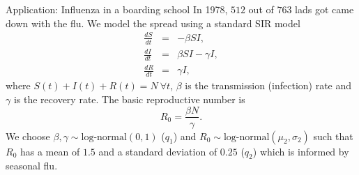 \begin{frame}{Application: Influenza in a boarding school}
In 1978, $512$ out of $763$ lads got came down with the flu.
We model the spread using a standard SIR model
\begin{eqnarray*}
\frac{dS}{dt}&=& - \beta SI,\\
\frac{dI}{dt}&=&  \beta SI - \gamma I,\\
\frac{dR}{dt}&=& \gamma I, 
\end{eqnarray*} 
where  $S(t) + I(t) + R(t) = N \: \forall t$, $\beta$ is the transmission (infection) rate and $\gamma$ is the recovery rate.
The basic reproductive number is 
\begin{equation}
\label{eq:r0def}
R_0 = \frac{\beta N}{\gamma}. 
\end{equation}
We choose $\beta, \gamma \sim \text{log-normal}(0, 1)$ ($q_1$) and $R_0 \sim  \text{log-normal}(\mu_2, \sigma_2)$ such that $R_0$ has a mean of $1.5$ and a standard deviation of $0.25$ ($q_2$) which is informed by seasonal flu. 
\end{frame}
